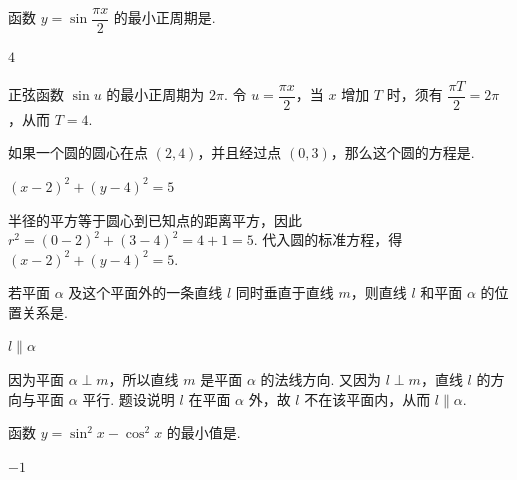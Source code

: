 \documentclass[UTF8,a4paper,oneside,11pt]{ctexbook}
\begin{document}
\begin{problem}

函数 \(y=\sin\dfrac{\pi x}{2}\) 的最小正周期是\fillinblank{}.

\begin{answer}
\(4\)
\end{answer}
\end{problem}

\begin{solution}
正弦函数 \(\sin u\) 的最小正周期为 \(2\pi\). 令 \(u=\dfrac{\pi x}{2}\)，当 \(x\) 增加 \(T\) 时，须有 \(\dfrac{\pi T}{2}=2\pi\)，从而 \(T=4\).
\end{solution}

\begin{problem}

如果一个圆的圆心在点 \((2,4)\)，并且经过点 \((0,3)\)，那么这个圆的方程是\fillinblank{}.

\begin{answer}
\(\left(x-2\right)^2+\left(y-4\right)^2=5\)
\end{answer}
\end{problem}

\begin{solution}
半径的平方等于圆心到已知点的距离平方，因此
\(r^2=\left(0-2\right)^2+\left(3-4\right)^2=4+1=5\). 代入圆的标准方程，得 \(\left(x-2\right)^2+\left(y-4\right)^2=5\).
\end{solution}

\begin{problem}

若平面 \(\alpha\) 及这个平面外的一条直线 \(l\) 同时垂直于直线 \(m\)，则直线 \(l\) 和平面 \(\alpha\) 的位置关系是\fillinblank{}.

\begin{answer}
\(l\parallel\alpha\)
\end{answer}
\end{problem}

\begin{solution}
因为平面 \(\alpha\perp m\)，所以直线 \(m\) 是平面 \(\alpha\) 的法线方向. 又因为 \(l\perp m\)，直线 \(l\) 的方向与平面 \(\alpha\) 平行. 题设说明 \(l\) 在平面 \(\alpha\) 外，故 \(l\) 不在该平面内，从而 \(l\parallel\alpha\).
\end{solution}

\begin{problem}

函数 \(y=\sin^{2}x-\cos^{2}x\) 的最小值是\fillinblank{}.

\begin{answer}
\(-1\)
\end{answer}
\end{problem}
\end{document}
